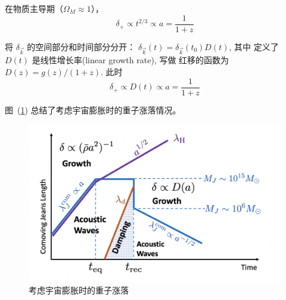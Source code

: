 \documentclass[12pt]{ctexart}
\newcommand{\reffig}[1]{图~(\ref{#1})}
\begin{document}
在物质主导期（$\Omega_M\approx 1$），
\begin{equation}
    \delta_{+}  \propto  t^{2/3} \propto a =\frac{1}{1+z}
\end{equation}

将 $\delta_{\vec{k}}$   的空间部分和时间部分分开： $\delta_{\vec{k}}(t) = \delta_{\vec{k}}(t_0) D(t)$, 其中 定义了 $D(t)$ 是线性增长率(linear growth rate), 写做 红移的函数为 $D(z)=g(z)/(1+z)$.
此时 
\begin{equation}
    \delta_{+} \propto D(t) \propto a =\frac{1}{1+z}
\end{equation}

\reffig{fig:Bary_pert} 总结了考虑宇宙膨胀时的重子涨落情况。

\begin{figure}[!hbtp]
	\centering 
	\includegraphics[width=1.0\linewidth]{Baryon_pert_H.png}
	\caption{考虑宇宙膨胀时的重子涨落}
    \label{fig:Bary_pert}
\end{figure}
\end{document}
